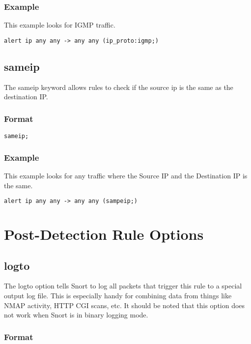 \documentclass[english]{report}
\begin{document}
\subsubsection{Example}
This example looks for IGMP traffic.

\begin{verbatim}
alert ip any any -> any any (ip_proto:igmp;)
\end{verbatim}

\subsection{sameip}

The sameip keyword allows rules to check if the source ip is the same as the destination IP.

\subsubsection{Format}

\begin{verbatim}
sameip;
\end{verbatim}

\subsubsection{Example}

This example looks for any traffic where the Source IP and the Destination IP is the same.

\begin{verbatim}
alert ip any any -> any any (sampeip;)
\end{verbatim}


\section{Post-Detection Rule Options}
\subsection{logto}

The logto option tells Snort to log all packets that trigger this rule to a
special output log file. This is especially handy for combining data from
things like NMAP activity, HTTP CGI scans, etc. It should be noted that this
option does not work when Snort is in binary logging mode.

\subsubsection{Format}
\end{document}
